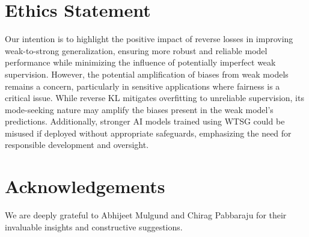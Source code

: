 \section*{Ethics Statement}
Our intention is to highlight the positive impact of reverse losses in improving weak-to-strong generalization, ensuring more robust and reliable model performance while minimizing the influence of potentially imperfect weak supervision.
However, the potential amplification of biases from weak models remains a concern, particularly in sensitive applications where fairness is a critical issue. While reverse KL mitigates overfitting to unreliable supervision, its mode-seeking nature may amplify the biases present in the weak model’s predictions.
Additionally, stronger AI models trained using WTSG could be misused if deployed without appropriate safeguards, emphasizing the need for responsible development and oversight.



\section*{Acknowledgements}
We are deeply grateful to Abhijeet Mulgund and Chirag Pabbaraju for their invaluable insights and constructive suggestions.



